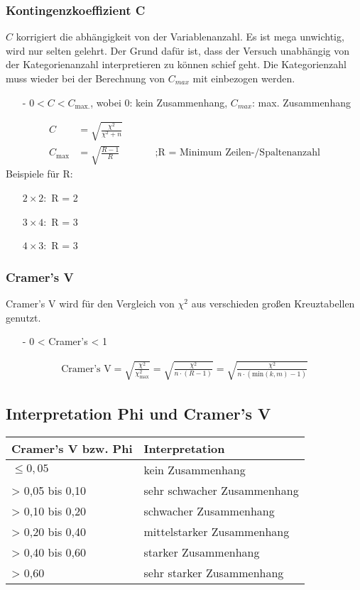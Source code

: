\subsubsection{Kontingenzkoeffizient C}
$C$ korrigiert die abhängigkeit von der Variablenanzahl. Es ist mega unwichtig, wird nur selten gelehrt. Der Grund dafür ist, dass der Versuch unabhängig von der Kategorienanzahl interpretieren zu können schief geht. Die Kategorienzahl muss wieder bei der Berechnung von $C_{max}$ mit einbezogen werden.
\begin{itemize}
  \item [-] $0 < C < C_{\textrm{max.}}$, wobei 0: kein Zusammenhang, $C_{max}$: max. Zusammenhang
\end{itemize}
\begin{align*}
  C &= \sqrt{\frac{\chi^2}{\chi^2 + n}}\\
  C_{\textrm{max}} &= \sqrt{\frac{R-1}{R}}~~~~~~~~~~~~~~~~\textrm{;R = Minimum Zeilen-/Spaltenanzahl}
\end{align*}
Beispiele für R:
\begin{itemize}
  \item [$2\times2:$] R = 2
  \item [$3\times4:$] R = 3
  \item [$4\times3:$] R = 3
\end{itemize}

\subsubsection{Cramer's V}
Cramer's V wird für den Vergleich von $\chi^2$ aus verschieden großen Kreuztabellen genutzt.
\begin{itemize}
  \item [-] 0 < Cramer's < 1
\end{itemize}
\begin{align*}
  \textrm{Cramer's V} = \sqrt{\frac{\chi^2}{\chi^2_{\textrm{max}}}} = \sqrt{\frac{\chi^2}{n\cdot(R - 1)}} = \sqrt{\frac{\chi^2}{n\cdot(\textrm{min}(k,m)-1)}}
\end{align*}

\subsection{Interpretation Phi und Cramer's V}
\begin{tabular}{l|l}
  Cramer's V bzw. Phi & Interpretation \\
\hline
  $\leq 0,05$     & kein Zusammenhang \\
  > 0,05 bis 0,10 & sehr schwacher Zusammenhang \\
  > 0,10 bis 0,20 & schwacher Zusammenhang \\
  > 0,20 bis 0,40 & mittelstarker Zusammenhang \\
  > 0,40 bis 0,60 & starker Zusammenhang \\
  > 0,60          & sehr starker Zusammenhang
\end{tabular}
\newpage

